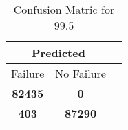 \begin{table}[] 
\caption{Confusion Matric for 99.5} 
\label{Table: Prediction Accuracy-DMD99.5OnlySunEKF-ignoreReflectionperfectNoFailurePrediction-Reflection} 
\centering 
\begin{tabular} 
 {@{}ccc@{}} 
\toprule 
\multicolumn{2}{c}{\textbf{Predicted}}
 \\ \midrule 
\multicolumn{1}{|c|}{Failure} & 
\multicolumn{1}{c|}{No Failure}
 \\ \midrule 
\multicolumn{1}{|c|}{\color{green}\textbf{82435}} & 
\multicolumn{1}{c|}{\color{red}\textbf{0}}
 \\ \midrule 
\multicolumn{1}{|c|}{\color{red}\textbf{403}} & 
\multicolumn{1}{c|}{\color{green}\textbf{87290}}
 \\ \bottomrule 
\end{tabular} 
\end{table} 
